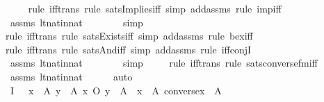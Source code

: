 \begin{isabellebody}
\ \ \ \ \isamarkupfalse%
{\isacharparenleft}{\kern0pt}rule\ iff{\isacharunderscore}{\kern0pt}trans{\isacharcomma}{\kern0pt}\ rule\ sats{\isacharunderscore}{\kern0pt}Implies{\isacharunderscore}{\kern0pt}iff{\isacharcomma}{\kern0pt}\ simp\ add{\isacharcolon}{\kern0pt}assms{\isacharcomma}{\kern0pt}\ rule\ imp{\isacharunderscore}{\kern0pt}iff{}{\isacharparenright}{\kern0pt}\isanewline
\ \ \ \ \isamarkupfalse%
\ assms\ lt{\isacharunderscore}{\kern0pt}nat{\isacharunderscore}{\kern0pt}in{\isacharunderscore}{\kern0pt}nat\ \isanewline
\ \ \ \ \ \isamarkupfalse%
\ simp\isanewline
\ \ \ \ \isamarkupfalse%
{\isacharparenleft}{\kern0pt}rule\ iff{\isacharunderscore}{\kern0pt}trans{\isacharcomma}{\kern0pt}\ rule\ sats{\isacharunderscore}{\kern0pt}Exists{\isacharunderscore}{\kern0pt}iff{\isacharcomma}{\kern0pt}\ simp\ add{\isacharcolon}{\kern0pt}assms{\isacharcomma}{\kern0pt}\ rule\ bex{\isacharunderscore}{\kern0pt}iff{\isacharparenright}{\kern0pt}\isanewline
\ \ \ \ \isamarkupfalse%
{\isacharparenleft}{\kern0pt}rule\ iff{\isacharunderscore}{\kern0pt}trans{\isacharcomma}{\kern0pt}\ rule\ sats{\isacharunderscore}{\kern0pt}And{\isacharunderscore}{\kern0pt}iff{\isacharcomma}{\kern0pt}\ simp\ add{\isacharcolon}{\kern0pt}assms{\isacharcomma}{\kern0pt}\ rule\ iff{\isacharunderscore}{\kern0pt}conjI{}{\isacharparenright}{\kern0pt}\isanewline
\ \ \ \ \isamarkupfalse%
\ assms\ lt{\isacharunderscore}{\kern0pt}nat{\isacharunderscore}{\kern0pt}in{\isacharunderscore}{\kern0pt}nat\ \isanewline
\ \ \ \ \ \isamarkupfalse%
\ simp\isanewline
\ \ \ \ \isamarkupfalse%
{\isacharparenleft}{\kern0pt}rule\ iff{\isacharunderscore}{\kern0pt}trans{\isacharcomma}{\kern0pt}\ rule\ sats{\isacharunderscore}{\kern0pt}converse{\isacharunderscore}{\kern0pt}fm{\isacharunderscore}{\kern0pt}iff{\isacharparenright}{\kern0pt}\ \ \isanewline
\ \ \ \ \isamarkupfalse%
\ assms\ lt{\isacharunderscore}{\kern0pt}nat{\isacharunderscore}{\kern0pt}in{\isacharunderscore}{\kern0pt}nat\isanewline
\ \ \ \ \isamarkupfalse%
\ auto\isanewline
\ \ \isamarkupfalse%
\ \isamarkupfalse%
\ I{}{\isacharcolon}{\kern0pt}\ {\isachardoublequoteopen}{\isachardot}{\kern0pt}{\isachardot}{\kern0pt}{\isachardot}{\kern0pt}\ {\isasymlongleftrightarrow}\ {\isacharparenleft}{\kern0pt}{\isasymforall}x\ {\isasymin}\ A{\isachardot}{\kern0pt}\ {\isasymforall}y\ {\isasymin}\ A{\isachardot}{\kern0pt}\ x\ O\ y\ {\isasymin}\ A{\isacharparenright}{\kern0pt}\ {\isasymand}\ {\isacharparenleft}{\kern0pt}{\isasymforall}x\ {\isasymin}\ A{\isachardot}{\kern0pt}\ converse{\isacharparenleft}{\kern0pt}x{\isacharparenright}{\kern0pt}\ {\isasymin}\ A{\isacharparenright}{\kern0pt}{\isachardoublequoteclose}\ \isanewline

\end{isabellebody}
